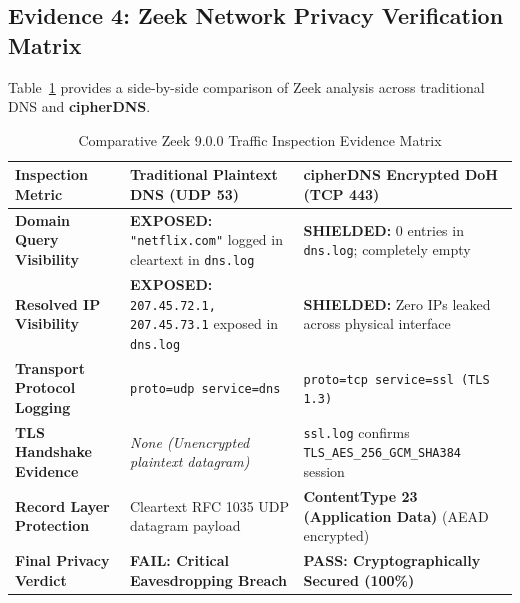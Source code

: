 \documentclass[10pt,a4paper]{article}
\begin{document}
\subsection{Evidence 4: Zeek Network Privacy Verification Matrix}
Table~\ref{tab:zeek_evidence} provides a side-by-side comparison of Zeek analysis across traditional DNS and \textbf{cipherDNS}.

\begin{table}[H]
\centering
\small
\caption{Comparative Zeek 9.0.0 Traffic Inspection Evidence Matrix}
\label{tab:zeek_evidence}
\begin{tabularx}{\textwidth}{l X X}
\toprule
\textbf{Inspection Metric} & \textbf{Traditional Plaintext DNS (UDP 53)} & \textbf{cipherDNS Encrypted DoH (TCP 443)} \\
\midrule
\textbf{Domain Query Visibility} & \textcolor{crimsonfail}{\textbf{EXPOSED:}} \texttt{"netflix.com"} logged in cleartext in \texttt{dns.log} & \textcolor{emeraldpass}{\textbf{SHIELDED:}} 0 entries in \texttt{dns.log}; completely empty \\
\addlinespace
\textbf{Resolved IP Visibility} & \textcolor{crimsonfail}{\textbf{EXPOSED:}} \texttt{207.45.72.1, 207.45.73.1} exposed in \texttt{dns.log} & \textcolor{emeraldpass}{\textbf{SHIELDED:}} Zero IPs leaked across physical interface \\
\addlinespace
\textbf{Transport Protocol Logging} & \texttt{proto=udp service=dns} & \texttt{proto=tcp service=ssl (TLS 1.3)} \\
\addlinespace
\textbf{TLS Handshake Evidence} & \textit{None (Unencrypted plaintext datagram)} & \texttt{ssl.log} confirms \texttt{TLS\_AES\_256\_GCM\_SHA384} session \\
\addlinespace
\textbf{Record Layer Protection} & Cleartext RFC 1035 UDP datagram payload & \textbf{ContentType 23 (Application Data)} (AEAD encrypted) \\
\addlinespace
\textbf{Final Privacy Verdict} & \textcolor{crimsonfail}{\textbf{FAIL: Critical Eavesdropping Breach}} & \textcolor{emeraldpass}{\textbf{PASS: Cryptographically Secured (100\%)}} \\
\bottomrule
\end{tabularx}
\end{table}
\end{document}
